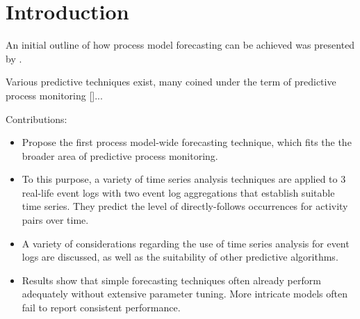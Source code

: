 \section{Introduction}\label{sec:introduction}

An initial outline of how process model forecasting can be achieved was presented by \cite{DBLP:conf/bpm/PollPRRR18}.

Various predictive techniques exist, many coined under the term of predictive process monitoring []...


Contributions:
\begin{itemize}
	\item Propose the first process model-wide forecasting technique, which fits the the broader area of predictive process monitoring.
	\item To this purpose, a variety of time series analysis techniques are applied to 3 real-life event logs with two event log aggregations that establish suitable time series. They predict the level of directly-follows occurrences for activity pairs over time.
	\item A variety of considerations regarding the use of time series analysis for event logs are discussed, as well as the suitability of other predictive algorithms.
	\item Results show that simple forecasting techniques often already perform adequately without extensive parameter tuning. More intricate models often fail to report consistent performance.
\end{itemize}
